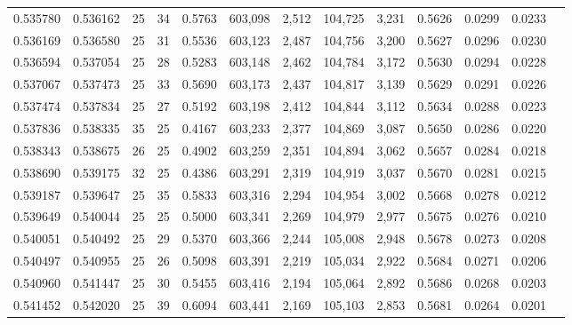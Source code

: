 \begin{tabular}{rrrrrrrrrrrrr}
0.535780 & 0.536162 &    25 &  34 &                                     0.5763 & 603,098 &   2,512 & 104,725 &   3,231 & 0.5626 & 0.0299 & 0.0233 \\
0.536169 & 0.536580 &    25 &  31 &                                     0.5536 & 603,123 &   2,487 & 104,756 &   3,200 & 0.5627 & 0.0296 & 0.0230 \\
0.536594 & 0.537054 &    25 &  28 &                                     0.5283 & 603,148 &   2,462 & 104,784 &   3,172 & 0.5630 & 0.0294 & 0.0228 \\
0.537067 & 0.537473 &    25 &  33 &                                     0.5690 & 603,173 &   2,437 & 104,817 &   3,139 & 0.5629 & 0.0291 & 0.0226 \\
0.537474 & 0.537834 &    25 &  27 &                                     0.5192 & 603,198 &   2,412 & 104,844 &   3,112 & 0.5634 & 0.0288 & 0.0223 \\
0.537836 & 0.538335 &    35 &  25 &                                     0.4167 & 603,233 &   2,377 & 104,869 &   3,087 & 0.5650 & 0.0286 & 0.0220 \\
0.538343 & 0.538675 &    26 &  25 &                                     0.4902 & 603,259 &   2,351 & 104,894 &   3,062 & 0.5657 & 0.0284 & 0.0218 \\
0.538690 & 0.539175 &    32 &  25 &                                     0.4386 & 603,291 &   2,319 & 104,919 &   3,037 & 0.5670 & 0.0281 & 0.0215 \\
0.539187 & 0.539647 &    25 &  35 &                                     0.5833 & 603,316 &   2,294 & 104,954 &   3,002 & 0.5668 & 0.0278 & 0.0212 \\
0.539649 & 0.540044 &    25 &  25 &                                     0.5000 & 603,341 &   2,269 & 104,979 &   2,977 & 0.5675 & 0.0276 & 0.0210 \\
0.540051 & 0.540492 &    25 &  29 &                                     0.5370 & 603,366 &   2,244 & 105,008 &   2,948 & 0.5678 & 0.0273 & 0.0208 \\
0.540497 & 0.540955 &    25 &  26 &                                     0.5098 & 603,391 &   2,219 & 105,034 &   2,922 & 0.5684 & 0.0271 & 0.0206 \\
0.540960 & 0.541447 &    25 &  30 &                                     0.5455 & 603,416 &   2,194 & 105,064 &   2,892 & 0.5686 & 0.0268 & 0.0203 \\
0.541452 & 0.542020 &    25 &  39 &                                     0.6094 & 603,441 &   2,169 & 105,103 &   2,853 & 0.5681 & 0.0264 & 0.0201 \\

\end{tabular}

